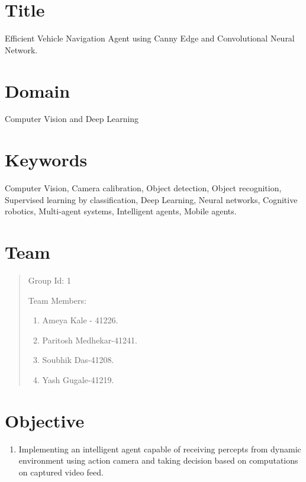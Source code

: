 \documentclass[12pt,a4paper,final]{article}
\begin{document}
\tableofcontents
\listoffigures
\listoftables

\section{Title}
\setcounter{page}{1}
\begin{flushleft}
\normalsize
Efficient Vehicle Navigation Agent using Canny Edge and Convolutional Neural Network.
\linebreak

\noindent
\section{Domain}
Computer Vision and Deep Learning
\linebreak

\noindent
\section{Keywords}
Computer Vision, Camera calibration, Object detection, Object recognition, Supervised learning by classification, Deep Learning, Neural networks, Cognitive robotics, Multi-agent systems, Intelligent agents, Mobile agents.


\noindent
\section{Team}
\begin{quotation}
Group Id: 1 \hfill
\linebreak

Team Members:
\begin{enumerate}
\item
Ameya Kale - 41226.

\item
Paritosh Medhekar-41241.

\item
Soubhik Das-41208.

\item

Yash Gugale-41219.
\end{enumerate}
\end{quotation}

\noindent
\section{Objective}
\begin{enumerate}
\item
Implementing an intelligent agent capable of receiving percepts from dynamic environment using action camera and taking decision based on computations on captured video feed.


\end{enumerate}
\end{flushleft}
\end{document}
